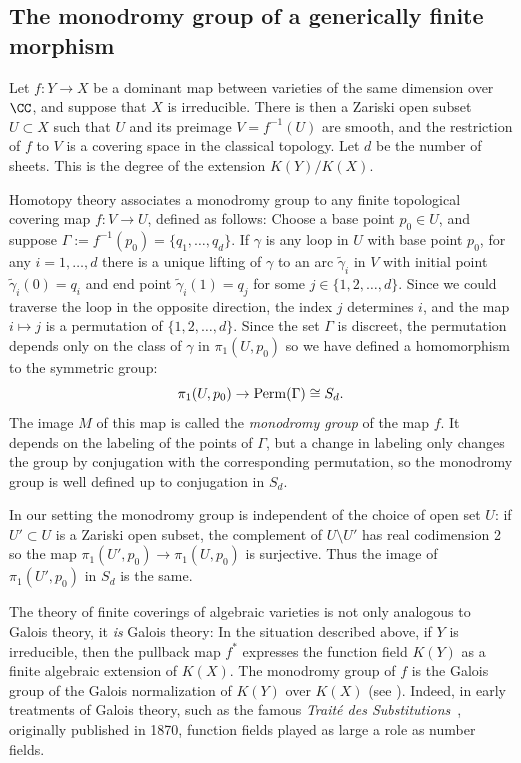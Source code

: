 \subsection{The monodromy group of a generically finite morphism}

Let $f : Y \to X$ be a dominant map between varieties of the same dimension over $\CC$, and suppose that $X$ is irreducible. There is then a Zariski open subset $U \subset X$ such that $U$ and 
its preimage $V = f^{-1}(U)$ are smooth, and the restriction of $f$ to $V$ is a covering space in the classical topology. Let $d$ be the number of sheets. This is the degree of the extension $K(Y)/K(X)$. %

Homotopy theory  associates a monodromy group to any finite topological covering map $f : V \to U$, defined as follows: Choose a base point $p_0 \in U$, and suppose $\Gamma := f^{-1}(p_0)  = \{q_1,\dots,q_d\}$. If $\gamma$ is any loop in $U$ with base point $p_0$, for any $i = 1, \dots, d$ there is a unique lifting of $\gamma$ to an arc $\tilde \gamma_i$ in $V$ with initial point $\tilde \gamma_i(0) = q_i$ and end point $\tilde \gamma_i(1) = q_j$ for some $j \in \{1,2,\dots,d\}$. Since we could traverse the loop in the opposite direction, the index $j$ determines $i$, and the map $i\mapsto j$ is a permutation of $\{1,2,\dots,d\}$. 
Since the set $\Gamma$ is discreet, the permutation depends only on the class of $\gamma$ in $\pi_1(U,p_0)$ so we have defined a homomorphism to the symmetric group:
$$
\pi_1(U,p_0)  \to {\rm Perm}(\Gamma) \cong S_d.
$$
The image $M$ of this map is called the \emph{monodromy group} of the map $f$. It depends on the labeling of the points of $\Gamma$, but a change in labeling
only changes the group by conjugation with the corresponding permutation, so the monodromy group is well defined up to 
conjugation in $S_{d}$.

\begin{fact}\label{Galois equals monodromy}
In our setting  the monodromy group is independent of the choice of open set $U$: if $U' \subset U$ is a Zariski open subset, the complement of $U\setminus U'$ has
real codimension 2 so the map $\pi_1(U', p_0) \to \pi_1(U,p_0)$ is surjective. Thus the image of $\pi_1(U', p_0)$ in $S_d$ is the same. 

The theory of finite coverings of algebraic varieties is not only analogous to Galois theory, it \emph{is} Galois theory: In the situation described above, if $Y$ is irreducible, then the pullback map $f^*$ expresses the function field $K(Y)$ as a finite algebraic extension of $K(X)$. The monodromy group of $f$  is the Galois group of the Galois normalization of $K(Y)$ over $K(X)$ (see \cite{Harris1979}). Indeed, in early treatments of Galois theory, such as the famous \emph{Trait\'e des Substitutions}~\cite{MR1188877}, originally published in 1870, function fields played as large a role as number fields.
\end{fact}

